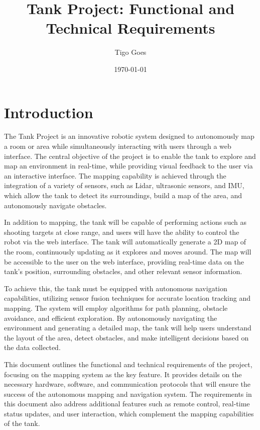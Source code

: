 \documentclass[a4paper,12pt]{article}
\title{Tank Project: Functional and Technical Requirements}
\author{Tigo Goes}
\date{\today}
\begin{document}
\maketitle

\newpage

\section*{Introduction}

The Tank Project is an innovative robotic system designed to autonomously map a room or area while simultaneously interacting with users through a web interface. The central objective of the project is to enable the tank to explore and map an environment in real-time, while providing visual feedback to the user via an interactive interface. The mapping capability is achieved through the integration of a variety of sensors, such as Lidar, ultrasonic sensors, and IMU, which allow the tank to detect its surroundings, build a map of the area, and autonomously navigate obstacles.

In addition to mapping, the tank will be capable of performing actions such as shooting targets at close range, and users will have the ability to control the robot via the web interface. The tank will automatically generate a 2D map of the room, continuously updating as it explores and moves around. The map will be accessible to the user on the web interface, providing real-time data on the tank's position, surrounding obstacles, and other relevant sensor information.

To achieve this, the tank must be equipped with autonomous navigation capabilities, utilizing sensor fusion techniques for accurate location tracking and mapping. The system will employ algorithms for path planning, obstacle avoidance, and efficient exploration. By autonomously navigating the environment and generating a detailed map, the tank will help users understand the layout of the area, detect obstacles, and make intelligent decisions based on the data collected.

This document outlines the functional and technical requirements of the project, focusing on the mapping system as the key feature. It provides details on the necessary hardware, software, and communication protocols that will ensure the success of the autonomous mapping and navigation system. The requirements in this document also address additional features such as remote control, real-time status updates, and user interaction, which complement the mapping capabilities of the tank.
\end{document}
